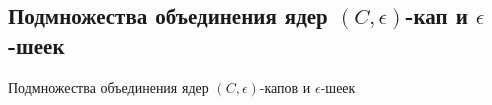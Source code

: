 \subsection{\texorpdfstring{Подмножества объединения ядер $(C,\epsilon)$-кап и $\epsilon$-шеек}{Подмножества объединения ядер (C,ϵ)-капов и ϵ-шеек}}
Подмножества объединения ядер $(C,\epsilon)$-капов и $\epsilon$-шеек